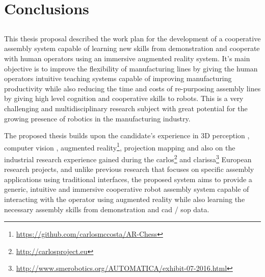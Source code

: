 \chapter{Conclusions}\label{chap:conclusions-and-future-work}



\section*{}

This thesis proposal described the work plan for the development of a cooperative assembly system capable of learning new skills from demonstration and cooperate with human operators using an immersive augmented reality system. It's main objective is to improve the flexibility of manufacturing lines by giving the human operators intuitive teaching systems capable of improving manufacturing productivity while also reducing the time and costs of re-purposing assembly lines by giving high level cognition and cooperative skills to robots. This is a very challenging and multidisciplinary research subject with great potential for the growing presence of robotics in the manufacturing industry.

The proposed thesis builds upon the candidate's experience in 3D perception \cite{Costa2015Diss,Costa2015ICIT,Costa2015Intech,Costa2016Elsevier}, computer vision \cite{Costa2014,Costa2016ICARSC}, augmented reality\footnote{\url{https://github.com/carlosmccosta/AR-Chess}}, projection mapping and also on the industrial research experience gained during the \gls{carlos}\footnote{\url{http://carlosproject.eu}} and \gls{clarissa}\footnote{\url{http://www.smerobotics.org/AUTOMATICA/exhibit-07-2016.html}} European research projects, and unlike previous research that focuses on specific assembly applications using traditional interfaces, the proposed system aims to provide a generic, intuitive and immersive cooperative robot assembly system capable of interacting with the operator using augmented reality while also learning the necessary assembly skills from demonstration and \gls{cad} / \gls{sop} data.